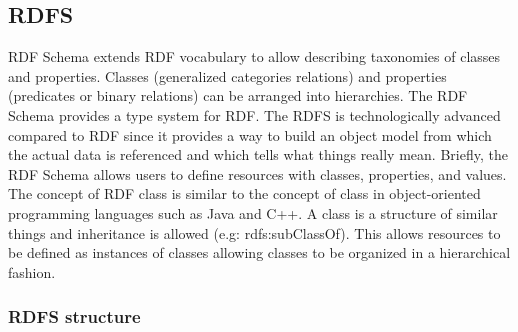 \subsection{RDFS}
RDF Schema  \cite{RDFSchema} extends RDF vocabulary to allow describing taxonomies of classes and properties. Classes (generalized categories relations) and properties (predicates or binary relations) can be arranged into hierarchies. 
The RDF Schema provides a type system for RDF. The RDFS is technologically advanced compared to RDF since it provides a way to build an object model from which the actual data is referenced and which tells what things really mean. Briefly, the RDF Schema allows users to define resources with classes, properties, and values. The concept of RDF class is similar to the concept of class in object-oriented programming languages such as Java and C++. A class is a structure of similar things and inheritance is allowed (e.g: rdfs:subClassOf). This allows resources to be defined as instances of classes allowing classes to be organized in a hierarchical fashion. 
\newpage
\subsubsection{RDFS structure}
\label{sub:rdfsConstructs}

